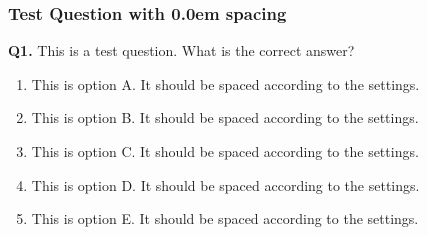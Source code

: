 \documentclass[
  letterpaper,
  DIV=11,
  numbers=noendperiod]{scrartcl}
\author{}
\date{}
\providecommand{\tightlist}{%
  \setlength{\itemsep}{0pt}\setlength{\parskip}{0pt}}
\def\tightlist{}
\begin{document}
\subsubsection{Test Question with 0.0em
spacing}\label{test-question-with-0.0em-spacing}

\textbf{Q1.} This is a test question. What is the correct answer?

\begin{enumerate}
\def\labelenumi{\alph{enumi}.}
\tightlist
\item
  This is option A. It should be spaced according to the settings.
\item
  This is option B. It should be spaced according to the settings.
\item
  This is option C. It should be spaced according to the settings.
\item
  This is option D. It should be spaced according to the settings.
\item
  This is option E. It should be spaced according to the settings.
\end{enumerate}
\end{document}
